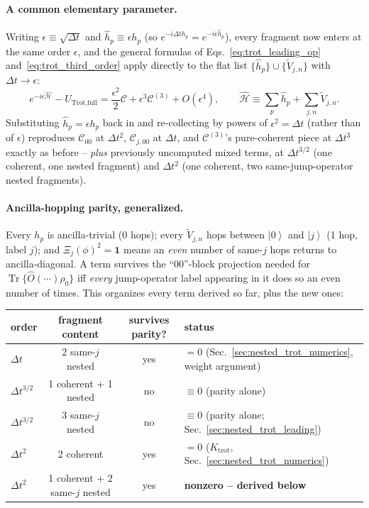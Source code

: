 \documentclass[11pt]{article}
\newcommand{\Dt}{\Delta t}
\newcommand{\calC}{\mathcal{C}}
\renewcommand{\ket}[1]{\left| #1 \right\rangle}
\DeclareMathOperator{\Tr}{Tr}
\begin{document}
\paragraph{A common elementary parameter.} Writing $\epsilon\equiv\sqrt{\Dt}$ and $\hat{h}_p\equiv\epsilon h_p$ (so $e^{-i\Dt h_p}=e^{-i\epsilon\hat{h}_p}$), every fragment now enters at the same order $\epsilon$, and the general formulas of Eqs.~\eqref{eq:trot_leading_op} and~\eqref{eq:trot_third_order} apply directly to the flat list $\{\hat{h}_p\}\cup\{\tilde{V}_{j,n}\}$ with $\Dt\to\epsilon$:
\begin{equation}
    e^{-i\epsilon\hat{\mathcal{H}}}-U_{\text{Trot,full}} = \frac{\epsilon^2}{2}\calC+\epsilon^3\calC^{(3)}+O(\epsilon^4),\qquad \hat{\mathcal{H}}\equiv\sum_p\hat{h}_p+\sum_{j,n}\tilde{V}_{j,n}.
\end{equation}
Substituting $\hat{h}_p=\epsilon h_p$ back in and re-collecting by powers of $\epsilon^2=\Dt$ (rather than of $\epsilon$) reproduces $\calC_{00}$ at $\Dt^2$, $\calC_{j,00}$ at $\Dt$, and $\calC^{(3)}$'s pure-coherent piece at $\Dt^3$ exactly as before -- \emph{plus} previously uncomputed mixed terms, at $\Dt^{3/2}$ (one coherent, one nested fragment) and $\Dt^2$ (one coherent, two same-jump-operator nested fragments).

\paragraph{Ancilla-hopping parity, generalized.} Every $h_p$ is ancilla-trivial (0 hops); every $\tilde{V}_{j,n}$ hops between $\ket0$ and $\ket j$ (1 hop, label $j$); and $\Xi_j(\phi)^2=\mathbf1$ means an \emph{even} number of same-$j$ hops returns to ancilla-diagonal. A term survives the ``00''-block projection needed for $\Tr\{\hat{O}(\cdots)\rho_0\}$ iff \emph{every} jump-operator label appearing in it does so an even number of times. This organizes every term derived so far, plus the new ones:
\begin{center}
\begin{tabular}{lccl}
order & fragment content & survives parity? & status\\
\hline
$\Dt$ & 2 same-$j$ nested & yes & $=0$ (Sec.~\ref{sec:nested_trot_numerics}, weight argument)\\
$\Dt^{3/2}$ & 1 coherent + 1 nested & no & $\equiv0$ (parity alone)\\
$\Dt^{3/2}$ & 3 same-$j$ nested & no & $\equiv0$ (parity alone; Sec.~\ref{sec:nested_trot_leading})\\
$\Dt^2$ & 2 coherent & yes & $=0$ ($K_{\text{trot}}$, Sec.~\ref{sec:nested_trot_numerics})\\
$\Dt^2$ & 1 coherent + 2 same-$j$ nested & yes & \textbf{nonzero -- derived below}
\end{tabular}
\end{center}
\end{document}
